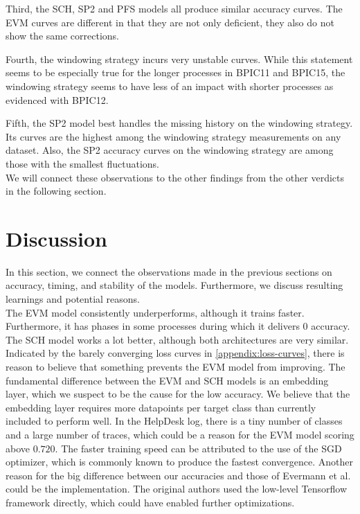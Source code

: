 Third, the SCH, SP2 and PFS models all produce similar accuracy curves.
The EVM curves are different in that they are not only deficient, they also do not show the same corrections.

Fourth, the windowing strategy incurs very unstable curves.
While this statement seems to be especially true for the longer processes in BPIC11 and BPIC15, the windowing strategy seems to have less of an impact with shorter processes as evidenced with BPIC12.

Fifth, the SP2 model best handles the missing history on the windowing strategy.
Its curves are the highest among the windowing strategy measurements on any dataset.
Also, the SP2 accuracy curves on the windowing strategy are among those with the smallest fluctuations.\\

We will connect these observations to the other findings from the other verdicts in the following section.

\section{Discussion}\label{sec:eval:discussion}
In this section, we connect the observations made in the previous sections on accuracy, timing, and stability of the models.
Furthermore, we discuss resulting learnings and potential reasons.\\

The EVM model consistently underperforms, although it trains faster.
Furthermore, it has phases in some processes during which it delivers $0$ accuracy.
The SCH model works a lot better, although both architectures are very similar.
Indicated by the barely converging loss curves in \autoref{appendix:loss-curves}, there is reason to believe that something prevents the EVM model from improving.
The fundamental difference between the EVM and SCH models is an embedding layer, which we suspect to be the cause for the low accuracy.
We believe that the embedding layer requires more datapoints per target class than currently included to perform well.
In the HelpDesk log, there is a tiny number of classes and a large number of traces, which could be a reason for the EVM model scoring above $0.720$.
The faster training speed can be attributed to the use of the SGD optimizer, which is commonly known to produce the fastest convergence.
Another reason for the big difference between our accuracies and those of Evermann et al. could be the implementation.
The original authors used the low-level Tensorflow framework directly, which could have enabled further optimizations.\\

